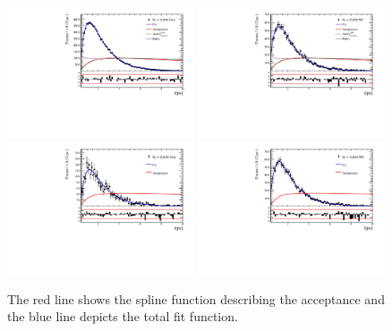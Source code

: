 \begin{figure}[h]
\includegraphics[height=!,width=0.49\textwidth]{figs/Acceptance/adaptive_N4/timeAccRatioFit_norm_combined.pdf}
\includegraphics[height=!,width=0.49\textwidth]{figs/Acceptance/adaptive_N4/timeAccRatioFit_norm_mc_combined.pdf}
\includegraphics[height=!,width=0.49\textwidth]{figs/Acceptance/adaptive_N4/timeAccRatioFit_signal_B0_combined.pdf}
\includegraphics[height=!,width=0.49\textwidth]{figs/Acceptance/adaptive_N4/timeAccRatioFit_signal_mc_combined.pdf}
\caption{The red line shows the spline function describing the acceptance and the blue line depicts the total fit function.}
\label{fig:accFit}
\end{figure}

